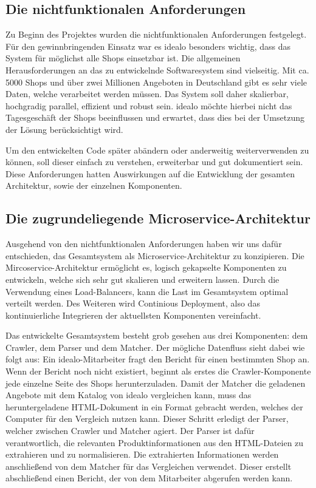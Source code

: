 \subsection{Die nichtfunktionalen Anforderungen}
\label{subsec:nichtfunktionale-anforderungen}

Zu Beginn des Projektes wurden die nichtfunktionalen Anforderungen festgelegt.
Für den gewinnbringenden Einsatz war es idealo besonders wichtig, dass das System für möglichst alle Shops einsetzbar
ist.
Die allgemeinen Herausforderungen an das zu entwickelnde Softwaresystem sind vielseitig.
Mit ca. 5000 Shops und über zwei Millionen Angeboten in Deutschland gibt es sehr viele Daten, welche verarbeitet
werden müssen.
Das System soll daher skalierbar, hochgradig parallel, effizient und robust sein.
idealo möchte hierbei nicht das Tagesgeschäft der Shops beeinflussen und erwartet, dass dies bei der Umsetzung der
Lösung berücksichtigt wird.

Um den entwickelten Code später abändern oder anderweitig weiterverwenden zu können, soll dieser einfach zu
verstehen, erweiterbar und gut dokumentiert sein.
Diese Anforderungen hatten Auswirkungen auf die Entwicklung der gesamten Architektur, sowie der einzelnen Komponenten.

\subsection{Die zugrundeliegende Microservice-Architektur}
\label{subsec:microservice-architektur}

Ausgehend von den nichtfunktionalen Anforderungen haben wir uns dafür entschieden, das Gesamtsystem als
Microservice-Architektur zu konzipieren.
Die Mircoservice-Architektur ermöglicht es, logisch gekapselte Komponenten zu entwickeln, welche sich sehr gut
skalieren und erweitern lassen.
Durch die Verwendung eines Load-Balancers, kann die Last im Gesamtsystem optimal verteilt werden.
Des Weiteren wird Continious Deployment, also das kontinuierliche Integrieren der aktuellsten Komponenten vereinfacht.

Das entwickelte Gesamtsystem besteht grob gesehen aus drei Komponenten: dem Crawler, dem Parser und dem Matcher.
Der mögliche Datenfluss sieht dabei wie folgt aus:
Ein idealo-Mitarbeiter fragt den Bericht für einen bestimmten Shop an.
Wenn der Bericht noch nicht existiert, beginnt als erstes die Crawler-Komponente jede einzelne Seite des Shops
herunterzuladen.
Damit der Matcher die geladenen Angebote mit dem Katalog von idealo vergleichen kann, muss das heruntergeladene
HTML-Dokument in ein Format gebracht werden, welches der Computer für den Vergleich nutzen kann.
Dieser Schritt erledigt der Parser, welcher zwischen Crawler und Matcher agiert.
Der Parser ist dafür verantwortlich, die relevanten Produktinformationen aus den HTML-Dateien zu extrahieren und zu
normalisieren.
Die extrahierten Informationen werden anschließend von dem Matcher für das Vergleichen verwendet.
Dieser erstellt abschließend einen Bericht, der von dem Mitarbeiter abgerufen werden kann.

